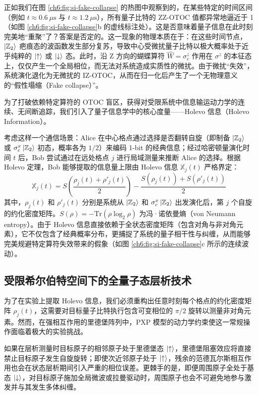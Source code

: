 \documentclass[../main.tex]{subfiles}
\begin{document}
正如我们在图 \ref{ch6:fig:si-fake-collapse} 的热图中观察到的，在某些特定的时间区间（例如 $t \approx 0.6\ \mu\text{s}$ 与 $t \approx 1.2\ \mu\text{s}$），所有量子比特的 ZZ-OTOC 值都异常地逼近于 1（如图 \ref{ch6:fig:si-fake-collapse}b 的虚线标注处）。这是否意味着量子信息在此时刻完美地“重聚”了？答案是否定的。这一现象的物理本质在于：在这些时间节点，$\ket{\mathbb{Z}_2}$ 疤痕态的波函数发生部分复苏，导致中心受微扰量子比特以极大概率处于近乎纯粹的 $\ket{\uparrow}$ 或 $\ket{\downarrow}$ 态。此时，沿 Z 方向的蝴蝶算符 $\hat{W}=\sigma_c^z$ 作用在 $\sigma^z$ 的本征态上，仅仅产生一个全局相位，而无法对系统造成实质性的微扰。由于微扰“失效”，系统演化退化为无微扰的 IZ-OTOC，从而在归一化后产生了一个无物理意义的“假性塌缩（Fake collapse）”。

为了打破依赖特定算符的 OTOC 盲区，获得对受限系统中信息输运动力学的连续、无间断追踪，我们引入了量子信息学中的核心度量——Holevo 信息（Holevo Information）。

考虑这样一个通信场景：Alice 在中心格点通过选择是否翻转自旋（即制备 $\ket{\mathbb{Z}_2}$ 或 $\sigma_c^x\ket{\mathbb{Z}_2}$ 初态，概率各为 $1/2$）来编码 1-bit 的经典信息；经过哈密顿量演化时间 $t$ 后，Bob 尝试通过在远处格点 $j$ 进行局域测量来推断 Alice 的选择。根据 Holevo 定理，Bob 能够提取的信息量上限由 Holevo 信息 $\mathbb{X}_j(t)$ 严格界定：
\begin{equation}
\mathbb{X}_j(t) = S\left(\frac{\rho_j(t) + \rho'_j(t)}{2}\right) - \frac{S(\rho_j(t)) + S(\rho'_j(t))}{2}
\label{ch6:eq:Holevo-information}
\end{equation}
其中，$\rho_j(t)$ 和 $\rho'_j(t)$ 分别是系统从 $\ket{\mathbb{Z}_2}$ 和 $\sigma_c^x\ket{\mathbb{Z}_2}$ 出发演化后，第 $j$ 个自旋的约化密度矩阵。$S(\rho) = -\text{Tr}(\rho \log_2 \rho)$ 为冯·诺依曼熵（von Neumann entropy）。由于 Holevo 信息直接依赖于全状态密度矩阵（包含对角与非对角元素），它不仅包含了经典概率分布，更捕捉了系统的量子相干性与纠缠，从而能够完美规避特定算符失效带来的假象（如图 \ref{ch6:fig:si-fake-collapse}c 所示的连续波动）。

\subsection{受限希尔伯特空间下的全量子态层析技术}

为了在实验上提取 Holevo 信息，我们必须重构出任意时刻每个格点的约化密度矩阵 $\rho_j(t)$，这需要对目标量子比特执行包含可变相位的 $\pi/2$ 旋转以测量非对角元素。然而，在强相互作用的里德堡阵列中，PXP 模型的动力学约束使这一常规操作面临着极大的实验挑战。

如果在层析测量时目标原子的相邻原子处于里德堡态 $\ket{\uparrow}$，里德堡阻塞效应将直接禁止目标原子发生自旋旋转；即使次近邻原子处于 $\ket{\uparrow}$，残余的范德瓦尔斯相互作用也会在状态层析期间引入严重的相位误差。更棘手的是，即便周围原子全处于基态 $\ket{\downarrow}$，对目标原子施加全局微波或拉曼驱动时，周围原子也会不可避免地参与激发并与其发生多体纠缠。
\end{document}
